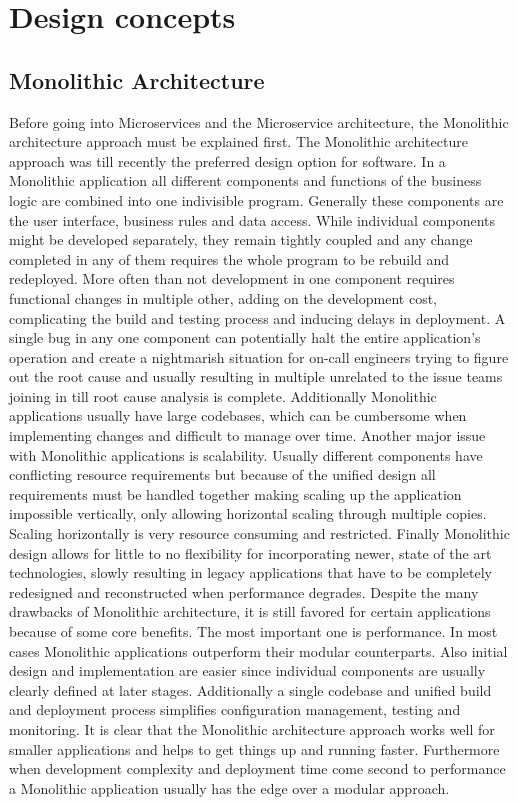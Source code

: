 \chapter{Design concepts} \label{ch:design_concepts}

\section{Monolithic Architecture}

Before going into Microservices and the Microservice architecture, the Monolithic architecture approach must be explained first. The Monolithic architecture approach was till recently the preferred design option for software. In a Monolithic application all different components and functions of the business logic are combined into one indivisible program\cite{monovsmicro}. Generally these components are the user interface, business rules and data access. While individual components might be developed separately, they remain tightly coupled\cite{whatismono} and any change completed in any of them requires the whole program to be rebuild and redeployed\cite{app10175797}. More often than not development in one component requires functional changes in multiple other, adding on the development cost, complicating the build and testing process and inducing delays in deployment. A single bug in any one component can potentially halt the entire application's operation and create a nightmarish situation for on-call engineers trying to figure out the root cause and usually resulting in multiple unrelated to the issue teams joining in till root cause analysis is complete. Additionally Monolithic applications usually have large codebases, which can be cumbersome when implementing changes and difficult to manage over time\cite{whatismono}. Another major issue with Monolithic applications is scalability. Usually different components have conflicting resource requirements but because of the unified design all requirements must be handled together making scaling up the application impossible vertically, only allowing horizontal scaling through multiple copies. Scaling horizontally is very resource consuming and restricted. Finally Monolithic design allows for little to no flexibility for incorporating newer, state of the art technologies, slowly resulting in legacy applications that have to be completely redesigned and reconstructed when performance degrades. Despite the many drawbacks of Monolithic architecture, it is still favored for certain applications because of some core benefits. The most important one is performance. In most cases Monolithic applications outperform their modular counterparts\cite{whatismono}. Also initial design and implementation are easier since individual components are usually clearly defined at later stages. Additionally a single codebase and unified build and deployment process simplifies configuration management, testing and monitoring\cite{whatismono}. It is clear that the Monolithic architecture approach works well for smaller applications and helps to get things up and running faster. Furthermore when development complexity and deployment time come second to performance a Monolithic application usually has the edge over a modular approach.

